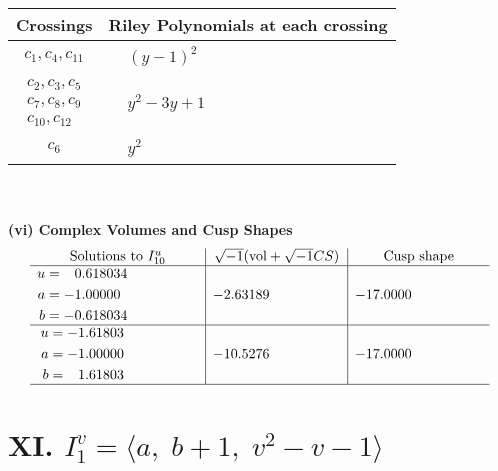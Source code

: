 \documentclass[1p]{elsarticle_modified}
\theoremstyle{definition}
\newcommand{\I}{\sqrt{-1}}
\begin{document}
\begin{tabular}{m{50pt}|m{274pt}}
Crossings & \hspace{64pt}Riley Polynomials at each crossing \\
\hline $$\begin{aligned}c_{1},c_{4},c_{11}\end{aligned}$$&$\begin{aligned}
&(y-1)^2
\end{aligned}$\\
\hline $$\begin{aligned}c_{2},c_{3},c_{5}\\c_{7},c_{8},c_{9}\\c_{10},c_{12}\end{aligned}$$&$\begin{aligned}
&y^2-3 y+1
\end{aligned}$\\
\hline $$\begin{aligned}c_{6}\end{aligned}$$&$\begin{aligned}
&y^2
\end{aligned}$\\
\hline
\end{tabular}\\~\\
\newpage\flushleft \textbf{(vi) Complex Volumes and Cusp Shapes}
$$\begin{array}{c|c|c}  
\text{Solutions to }I^u_{10}& \I (\text{vol} + \sqrt{-1}CS) & \text{Cusp shape}\\
 \hline 
\begin{aligned}
u &= \phantom{-}0.618034\phantom{ +0.000000I} \\
a &= -1.00000\phantom{ +0.000000I} \\
b &= -0.618034\phantom{ +0.000000I}\end{aligned}
 & -2.63189\phantom{ +0.000000I} & -17.0000\phantom{ +0.000000I} \\ \hline\begin{aligned}
u &= -1.61803\phantom{ +0.000000I} \\
a &= -1.00000\phantom{ +0.000000I} \\
b &= \phantom{-}1.61803\phantom{ +0.000000I}\end{aligned}
 & -10.5276\phantom{ +0.000000I} & -17.0000\phantom{ +0.000000I}\\
 \hline 
 \end{array}$$\newpage\newpage\renewcommand{\arraystretch}{1}
\centering \section*{XI. $I^v_{1}= \langle a,\;b+1,\;v^2- v-1 \rangle$}
\end{document}

